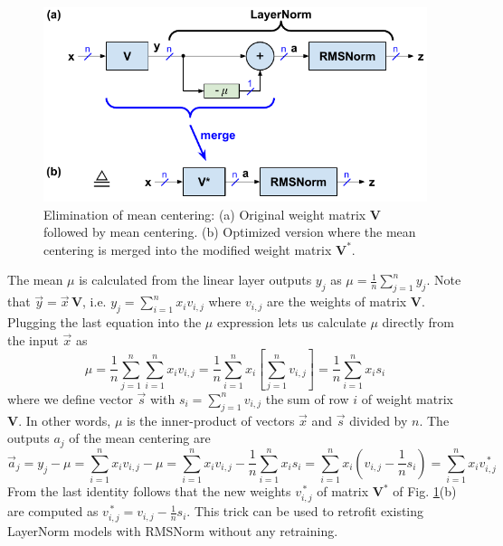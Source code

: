 \documentclass{article}
\newcommand{\mat}[1]{\mathbf{#1}}     %
\def\V*{\mat{V}^\ast}                 %
\def\mV{\mat{V}}                      %
\def\a{\vec{a}}                       %
\def\vx{\vec{x}}                      %
\def\vy{\vec{y}}                      %
\def\vs{\vec{s}}                      %
\begin{document}
\begin{figure}[h!] \centering  %
  \includegraphics[scale=0.9]{../doc/fig/flashNorm_figB.pdf}
  \caption{Elimination of mean centering: (a) Original weight matrix $\mV$ followed by mean centering. (b) Optimized version where the mean centering is merged into the modified weight matrix $\V*$.}
\label{figB} \end{figure}

The mean $\mu$ is calculated from the linear layer outputs $y_j$ as $\mu = \frac{1}{n} \sum_{j=1}^n y_j$. Note that $\vy = \vx \, \mV$, i.e. $y_j = \sum_{i=1}^n x_i v_{i, j}$ where $v_{i, j}$ are the weights of matrix $\mV$. Plugging the last equation into the $\mu$ expression lets us calculate $\mu$ directly from the input $\vx$ as
\begin{equation*}
  \mu = \frac{1}{n} \sum_{j=1}^n \sum_{i=1}^n x_i v_{i, j} = \frac{1}{n} \sum_{i=1}^n x_i \left[ \sum_{j=1}^n v_{i, j} \right] = \frac{1}{n} \sum_{i=1}^n x_i s_i
\end{equation*}
where we define vector $\vs$ with $s_i = \sum_{j=1}^n v_{i, j}$ the sum of row $i$ of weight matrix $\mV$. In other words, $\mu$ is the inner-product of vectors $\vx$ and $\vs$ divided by $n$. The outputs $a_j$ of the mean centering are
\begin{equation*}
  \a_j = y_j - \mu = \sum_{i=1}^n x_i v_{i, j} - \mu = \sum_{i=1}^n x_i v_{i, j} - \frac{1}{n} \sum_{i=1}^n x_i s_i = \sum_{i=1}^n x_i \left( v_{i, j} - \frac{1}{n} s_i \right)
                   = \sum_{i=1}^n x_i v^{\, \ast}_{i, j}
\end{equation*}
From the last identity follows that the new weights $v^{\, \ast}_{i, j}$ of matrix $\V*$ of Fig. \ref{figB}(b) are computed as $v^{\, \ast}_{i, j} = v_{i, j} - \frac{1}{n} s_i$. This trick can be used to retrofit existing LayerNorm models with RMSNorm without any retraining.
\end{document}
